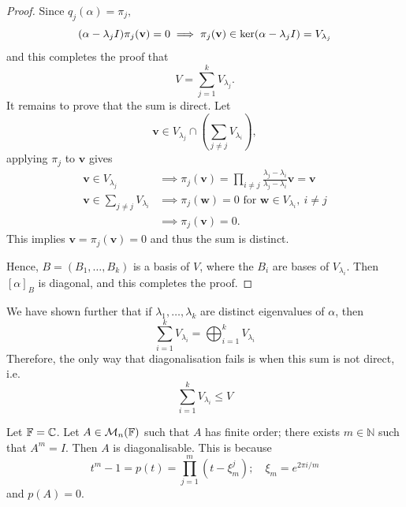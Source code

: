 \documentclass[a4paper,11pt]{article}
\begin{document}
\begin{proof}
	Since $ q_j(\alpha) = \pi_j, $
	\[
		(\alpha - \lambda_j I) \pi_j({\bf v}) = 0 \implies \pi_j({\bf v}) \in \ker(\alpha - \lambda_j I) = V_{\lambda_j}
	\]
	and this completes the proof that 
	\[
		V = \sum_{j=1}^{k} V_{\lambda_j}. 
	\]
	It remains to prove that the sum is direct. Let 
	\[
		\mathbf{v} \in V_{\lambda_j} \cap \left( \sum_{j\neq j} V_{\lambda_i} \right),
	\]
	applying $\pi_j$ to $\mathbf{v}$ gives 
	\begin{align*}
		\mathbf{v}\in V_{\lambda_j} &\implies \pi_j(\mathbf{v}) = \prod_{i\neq j} \frac{\lambda_j-\lambda_i}{\lambda_j-\lambda_i}\mathbf{v} = \mathbf{v}\\ 
		\mathbf{v}\in \sum_{j\neq j} V_{\lambda_i} &\implies \pi_j(\mathbf{w}) = 0 \text{ for } \mathbf{w} \in V_{\lambda_i},\ i\neq j\\ 
		&\implies \pi_j(\mathbf{v}) = 0. 
	\end{align*}
	This implies $ \mathbf{v} = \pi_j(\mathbf{v}) = 0 $ and thus the sum is distinct. 

	Hence, $ B = (B_1, \dots, B_k) $ is a basis of $ V $, where the $ B_i $ are bases of $ V_{\lambda_i} $.
	Then $ [\alpha]_B $ is diagonal, and this completes the proof. 
\end{proof} 

\begin{remark}
	We have shown further that if $ \lambda_1, \dots, \lambda_k $ are distinct eigenvalues of $ \alpha $, then
	\[
		\sum_{i=1}^k V_{\lambda_i} = \bigoplus_{i=1}^k V_{\lambda_i}
	\]
	Therefore, the only way that diagonalisation fails is when this sum is not direct, i.e.
	\[
		\sum_{i=1}^k V_{\lambda_i} \le V
	\]
\end{remark}

\begin{example}
	Let $ {\mathbb{F}} = \mathbb C $.
	Let $ A \in {\mathcal{M}}_n({\mathbb{F}}) $ such that $ A $ has finite order; there exists $ m \in \mathbb N $ such that $ A^m = I $.
	Then $ A $ is diagonalisable.
	This is because
	\[
		t^m - 1 = p(t) = \prod_{j=1}^m (t - \xi_m^j);\quad \xi_m = e^{2 \pi i/m}
	\]
	and $ p(A) = 0 $.
\end{example}
\end{document}
